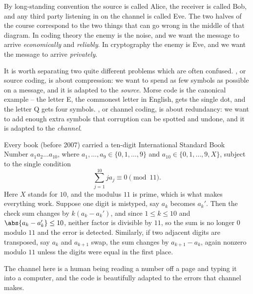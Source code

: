 \begin{center}
\end{center}

By long-standing convention the source is called Alice, the receiver is called Bob, and any third party listening in on the channel is called Eve. The two halves of the course correspond to the two things that can go wrong in the middle of that diagram. In coding theory the enemy is the noise, and we want the message to arrive \emph{economically} and \emph{reliably}. In cryptography the enemy is Eve, and we want the message to arrive \emph{privately}.

It is worth separating two quite different problems which are often confused. , or source coding, is about compression: we want to spend as few symbols as possible on a message, and it is adapted to the \emph{source}. Morse code is the canonical example -- the letter E, the commonest letter in English, gets the single dot, and the letter Q gets four symbols. , or channel coding, is about redundancy: we want to add enough extra symbols that corruption can be spotted and undone, and it is adapted to the \emph{channel}.

\begin{example}[ISBNs]
	Every book (before 2007) carried a ten-digit International Standard Book Number $a_1 a_2 \dots a_{10}$, where $a_1, \dots, a_9 \in \{0, 1, \dots, 9\}$ and $a_{10} \in \{0, 1, \dots, 9, X\}$, subject to the single condition
	$$\sum_{j=1}^{10} j a_j \equiv 0 \pmod{11}.$$
	Here $X$ stands for $10$, and the modulus $11$ is prime, which is what makes everything work. Suppose one digit is mistyped, say $a_k$ becomes $a_k'$. Then the check sum changes by $k(a_k - a_k')$, and since $1 \le k \le 10$ and $\abs{a_k - a_k'} \le 10$, neither factor is divisible by $11$, so the sum is no longer $0$ modulo $11$ and the error is detected. Similarly, if two adjacent digits are transposed, say $a_k$ and $a_{k+1}$ swap, the sum changes by $a_{k+1} - a_k$, again nonzero modulo $11$ unless the digits were equal in the first place.

	The channel here is a human being reading a number off a page and typing it into a computer, and the code is beautifully adapted to the errors that channel makes.
\end{example}

